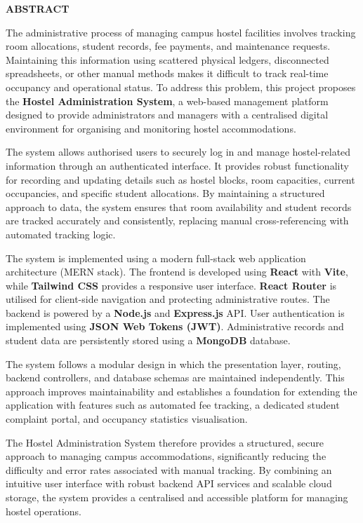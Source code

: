 \newpage
\thispagestyle{empty}

\begin{center}
{\Large\textbf{ABSTRACT}}
\end{center}

\vspace{1cm}

The administrative process of managing campus hostel facilities involves tracking 
room allocations, student records, fee payments, and maintenance requests. 
Maintaining this information using scattered physical ledgers, disconnected 
spreadsheets, or other manual methods makes it difficult to track real-time 
occupancy and operational status. To address this problem, this project proposes 
the \textbf{Hostel Administration System}, a web-based management platform 
designed to provide administrators and managers with a centralised digital 
environment for organising and monitoring hostel accommodations.

The system allows authorised users to securely log in and manage hostel-related 
information through an authenticated interface. It provides robust functionality 
for recording and updating details such as hostel blocks, room capacities, 
current occupancies, and specific student allocations. By maintaining a 
structured approach to data, the system ensures that room availability and 
student records are tracked accurately and consistently, replacing manual 
cross-referencing with automated tracking logic.

The system is implemented using a modern full-stack web application architecture 
(MERN stack). The frontend is developed using \textbf{React} with \textbf{Vite}, 
while \textbf{Tailwind CSS} provides a responsive user interface. \textbf{React 
Router} is utilised for client-side navigation and protecting administrative routes. 
The backend is powered by a \textbf{Node.js} and \textbf{Express.js} API. User 
authentication is implemented using \textbf{JSON Web Tokens (JWT)}. Administrative 
records and student data are persistently stored using a \textbf{MongoDB} database.

The system follows a modular design in which the presentation layer, routing, 
backend controllers, and database schemas are maintained independently. This 
approach improves maintainability and establishes a foundation for extending the 
application with features such as automated fee tracking, a dedicated student 
complaint portal, and occupancy statistics visualisation. 

The Hostel Administration System therefore provides a structured, secure approach 
to managing campus accommodations, significantly reducing the difficulty and error 
rates associated with manual tracking. By combining an intuitive user interface 
with robust backend API services and scalable cloud storage, the system provides 
a centralised and accessible platform for managing hostel operations.
